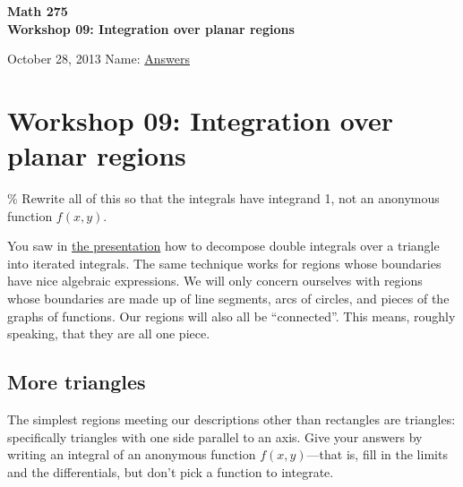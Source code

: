\documentclass[]{exam}
\begin{document}
\printanswers

\noindent
\textbf{{\large Math 275 \\ Workshop 09: Integration over planar regions}}

\noindent
October 28, 2013  %
\hfill Name: \underline{\hspace{0.5in}Answers\hspace{2in}}

\section{Workshop 09: Integration over planar regions}

\% Rewrite all of this so that the integrals have integrand 1, not an
anonymous function $f(x,y)$.

You saw in \href{../../decks/13/Deck.pdf}{the presentation} how to
decompose double integrals over a triangle into iterated integrals. The
same technique works for regions whose boundaries have nice algebraic
expressions. We will only concern ourselves with regions whose
boundaries are made up of line segments, arcs of circles, and pieces of
the graphs of functions. Our regions will also all be ``connected''.
This means, roughly speaking, that they are all one piece.

\subsection{More triangles}

The simplest regions meeting our descriptions other than rectangles are
triangles: specifically triangles with one side parallel to an axis.
Give your answers by writing an integral of an anonymous function
$f(x,y)$---that is, fill in the limits and the differentials, but don't
pick a function to integrate.
\end{document}
